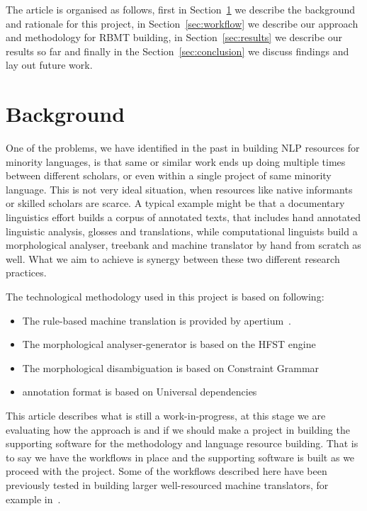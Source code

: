 \documentclass[11pt]{article}
\begin{document}
The article is organised as follows, first in Section~\ref{sec:background} we
describe the background and rationale for this project, in
Section~\ref{sec:workflow} we describe our approach and methodology for RBMT
building, in Section~\ref{sec:results} we describe our results so far and
finally in the Section~\ref{sec:conclusion} we discuss findings and lay out
future work.

\section{Background}
\label{sec:background}

One of the problems, we have identified in the past in building NLP resources
for minority languages, is that same or similar work ends up doing multiple
times between different scholars, or even within a single project of same
minority language. This is not very ideal situation, when resources like native
informants or skilled scholars are scarce. A typical example might be that a
documentary linguistics effort builds a corpus of annotated texts, that
includes hand annotated linguistic analysis, glosses and translations, while
computational linguists build a morphological analyser, treebank and machine
translator by hand from scratch as well. What we aim to achieve is synergy
between these two different research practices.

The technological methodology used in this project is based on following:
\begin{itemize}
    \item The rule-based machine translation is provided by
        apertium~\cite{apertium}.
    \item The morphological analyser-generator is based on the HFST
        engine~\cite{linden2009hfst}
    \item The morphological disambiguation is based on Constraint
        Grammar~\cite{karlsson1990constraint}
    \item annotation format is based on Universal dependencies~\cite{ud24}
\end{itemize}

This article describes what is still a work-in-progress, at this stage we are
evaluating how the approach is and if we should make a project in building the
supporting software for the methodology and language resource building. That is
to say we have the workflows in place and the supporting software is built as we
proceed with the project.
Some of the workflows described here have been previously tested in building
larger well-resourced machine translators, for example in~\cite{pirinen2018rulebased}.
\end{document}
